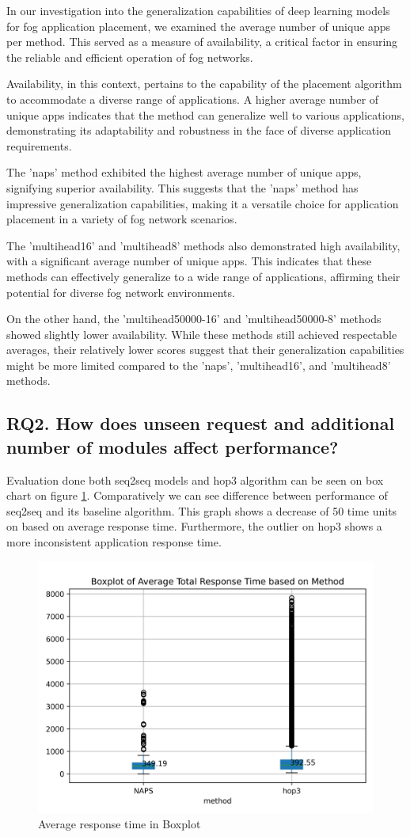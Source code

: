 \documentclass[conference]{IEEEtran}
\begin{document}
In our investigation into the generalization capabilities of deep learning models for fog application placement, we examined the average number of unique apps per method. This served as a measure of availability, a critical factor in ensuring the reliable and efficient operation of fog networks.

Availability, in this context, pertains to the capability of the placement algorithm to accommodate a diverse range of applications. A higher average number of unique apps indicates that the method can generalize well to various applications, demonstrating its adaptability and robustness in the face of diverse application requirements.

The 'naps' method exhibited the highest average number of unique apps, signifying superior availability. This suggests that the 'naps' method has impressive generalization capabilities, making it a versatile choice for application placement in a variety of fog network scenarios.

The 'multihead16' and 'multihead8' methods also demonstrated high availability, with a significant average number of unique apps. This indicates that these methods can effectively generalize to a wide range of applications, affirming their potential for diverse fog network environments.

On the other hand, the 'multihead50000-16' and 'multihead50000-8' methods showed slightly lower availability. While these methods still achieved respectable averages, their relatively lower scores suggest that their generalization capabilities might be more limited compared to the 'naps', 'multihead16', and 'multihead8' methods.

\subsection*{RQ2. How does unseen request and additional number of modules affect performance?}


Evaluation done both seq2seq models and hop3 algorithm can be seen on box chart on figure \ref{fig:Avgresponsetimebox}. Comparatively we can see difference between performance of seq2seq and its baseline algorithm. This graph shows a decrease of 50 time units on based on average response time. Furthermore, the outlier on hop3 shows a more inconsistent application response time. 

\begin{figure}[!h]
	\centering
	\includegraphics[width=.48\textwidth]{fig/test.png}
	\caption{Average response time in Boxplot}
	\label{fig:Avgresponsetimebox}
\end{figure}
\end{document}
